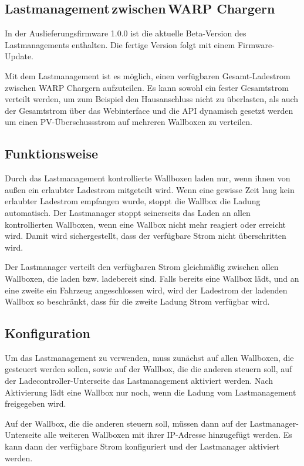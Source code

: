 \documentclass[a4paper,10pt]{article}
\newcommand{\hint}[1]{\begin{tcolorbox}[colback=boxgray,colframe=black,coltext=
white,title=Hinweis,left*=2mm,right*=2mm,boxsep=1mm,bottom=1mm,top=1mm]#1\end{tcolorbox}}
\begin{document}
\begin{multicols*}{2}
	\newpage
	\section{Lastmanagement\,zwischen\,WARP Chargern}\label{charge_manager}
	\hint{In der Auslieferungsfirmware 1.0.0 ist die aktuelle Beta-Version des Lastmanagements enthalten.
	Die fertige Version folgt mit einem Firmware-Update.}
	Mit dem Lastmanagement ist es möglich, einen verfügbaren Gesamt-Ladestrom zwischen WARP Chargern aufzuteilen.
	Es kann sowohl ein fester Gesamtstrom verteilt werden, um zum Beispiel den Hausanschluss nicht zu überlasten,
	als auch der Gesamtstrom über das Webinterface und die API dynamisch gesetzt werden
	um einen PV-Überschussstrom auf mehreren Wallboxen zu verteilen.

	\subsection{Funktionsweise}
	Durch das Lastmanagement kontrollierte Wallboxen laden nur,
	wenn ihnen von außen ein erlaubter Ladestrom mitgeteilt wird. Wenn eine gewisse Zeit lang
	kein erlaubter Ladestrom empfangen wurde, stoppt die Wallbox die Ladung automatisch.
	Der Lastmanager stoppt seinerseits das Laden an allen kontrollierten Wallboxen,
	wenn eine Wallbox nicht mehr reagiert oder erreicht wird. Damit wird sichergestellt,
	dass der verfügbare Strom nicht überschritten wird.

	Der Lastmanager verteilt den verfügbaren Strom gleichmäßig zwischen allen Wallboxen, die laden bzw. ladebereit sind.
	Falls bereits eine Wallbox lädt, und an eine zweite ein Fahrzeug angeschlossen wird,
	wird der Ladestrom der ladenden Wallbox so beschränkt, dass für die zweite Ladung Strom verfügbar wird.

	\subsection{Konfiguration}
	Um das Lastmanagement zu verwenden, muss zunächst auf allen Wallboxen, die gesteuert werden sollen,
	sowie auf der Wallbox, die die anderen steuern soll, auf der Ladecontroller-Unterseite
	das Lastmanagement aktiviert werden. Nach Aktivierung lädt eine Wallbox nur noch,
	wenn die Ladung vom Lastmanagement freigegeben wird.

	Auf der Wallbox, die die anderen steuern soll, müssen dann auf der Lastmanager-Unterseite
	alle weiteren Wallboxen mit ihrer IP-Adresse hinzugefügt werden.
	Es kann dann der verfügbare Strom konfiguriert und der Lastmanager aktiviert werden.


\end{multicols*}
\end{document}
